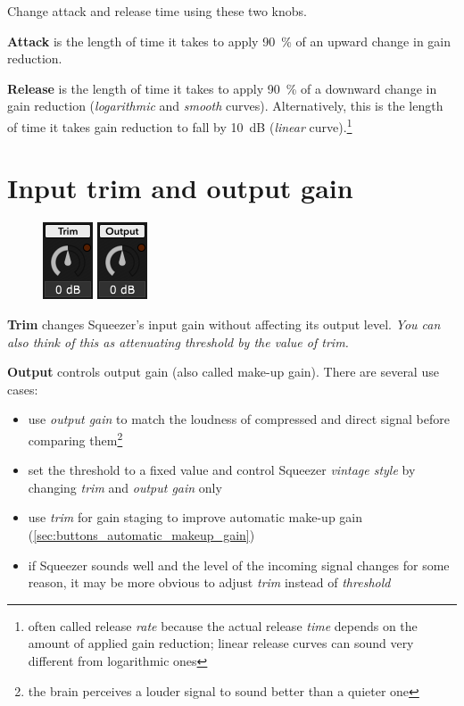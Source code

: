 Change attack and release time using these two knobs.

\textbf{Attack} is the length of time it takes to apply
\SI{90}{\percent} of an upward change in gain reduction.

\textbf{Release} is the length of time it takes to apply
\SI{90}{\percent} of a downward change in gain reduction
(\emph{logarithmic} and \emph{smooth} curves).  Alternatively, this is
the length of time it takes gain reduction to fall by \SI{10}{\dB}
(\emph{linear} curve).\footnote{often called release \emph{rate}
  because the actual release \emph{time} depends on the amount of
  applied gain reduction; linear release curves can sound very
  different from logarithmic ones}

\section{Input trim and output gain}
\label{sec:input_trim_and_output_gain}

\begin{figure}
  \includegraphics[scale=\screenshotscale,clip]{include/images/knob_input_trim.png}
  \includegraphics[scale=\screenshotscale,clip]{include/images/knob_output_gain.png}
\end{figure}

\textbf{Trim} changes Squeezer's input gain without affecting its
output level.  \emph{You can also think of this as attenuating
  threshold by the value of trim.}

\textbf{Output} controls output gain (also called make-up gain).
There are several use cases:

\begin{itemize}
\item use \emph{output gain} to match the loudness of compressed and
  direct signal before comparing them\footnote{the brain perceives a
    louder signal to sound better than a quieter one}

\item set the threshold to a fixed value and control Squeezer
  \emph{vintage style} by changing \emph{trim} and \emph{output gain}
  only

\item use \emph{trim} for gain staging to improve automatic make-up
  gain (\ref{sec:buttons_automatic_makeup_gain})

\item if Squeezer sounds well and the level of the incoming signal
  changes for some reason, it may be more obvious to adjust
  \emph{trim} instead of \emph{threshold}
\end{itemize}

